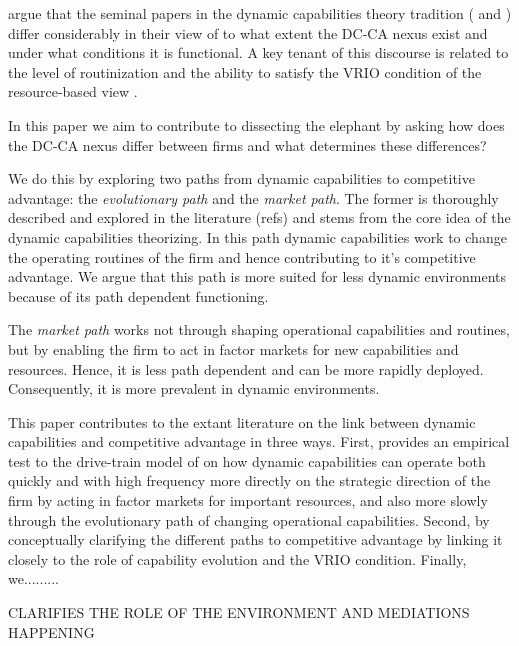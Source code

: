 \documentclass[review,fleqn]{elsarticle}\usepackage[]{graphicx}\usepackage[]{color}
\begin{document}
\cite{Peteraf2013} argue that the seminal papers in the dynamic capabilities theory
tradition (\cite{Teece1997} and \cite{Eisenhardt2000}) differ considerably in their view
of to what extent the DC-CA nexus exist and under what conditions it is functional. A key
tenant of this discourse is related to the level of routinization and the ability to
satisfy the VRIO condition \citep{Barney1991a} of the resource-based view
\citep{Peteraf2013}. 

In this paper we aim to contribute to dissecting the elephant by asking how does the DC-CA
nexus differ between firms and what determines these differences? 

We do this by exploring two paths from dynamic capabilities to competitive advantage: the
\emph{evolutionary path} and the \emph{market path}. The former is thoroughly described
and explored in the literature (refs) and stems from the core idea of the dynamic
capabilities theorizing. In this path dynamic capabilities work to change the operating
routines of the firm and hence contributing to it's competitive advantage. We argue that
this path is more suited for less dynamic environments because of its path dependent
functioning.

The \emph{market path} works not through shaping operational capabilities and routines,
but by enabling the firm to act in factor markets for new capabilities and
resources. Hence, it is less path dependent and can be more rapidly
deployed. Consequently, it is more prevalent in dynamic environments.

This paper contributes to the extant literature on the link between dynamic capabilities
and competitive advantage in three ways. First, provides an empirical test to the
drive-train model of \cite{DiStefano2014} on how dynamic capabilities can operate both
quickly and with high frequency more directly on the strategic direction of the firm by
acting in factor markets for important resources, and also more slowly through the
evolutionary path of changing operational capabilities. Second, by conceptually clarifying
the different paths to competitive advantage by linking it closely to the role of
capability evolution and the VRIO condition. Finally, we.........

CLARIFIES THE ROLE OF THE ENVIRONMENT AND MEDIATIONS HAPPENING


\end{document}
